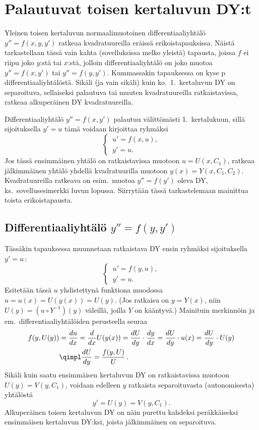 \section{Palautuvat toisen kertaluvun DY:t}
\label{toisen kertaluvun dy}
\alku

Yleinen toisen kertaluvun normaalimuotoinen differentiaaliyhtälö $y''=f(x,y,y')$ ratkeaa
kvadratuureilla eräissä erikoistapauksissa. Näistä tarkastellaan tässä vain kahta
(sovelluksissa melko yleistä) tapausta, joissa $f$ ei riipu joko $y$:stä tai $x$:stä, jolloin 
differentiaaliyhtälö on joko muotoa $y''=f(x,y')$ tai $y''=f(y,y')$. Kummassakin tapauksessa on
kyse   p differentiaaliyhtälöstä. Sikäli 
(ja vain sikäli) kuin ko.\ 1.\ kertaluvun DY on separoituva, sellaiseksi palautuva tai muuten
kvadratuureilla ratkaistavissa, ratkeaa alkuperäinen DY kvadratuureilla.

%
Differentiaaliyhtälö $y''=f(x,y')$ palautuu välittömästi 1.\ kertalukuun, sillä sijoituksella
$y'=u$ tämä voidaan kirjoittaa ryhmäksi
\[
\begin{cases} \,u'=f(x,u), \\ \,y'=u. \end{cases}
\]
Jos tässä ensimmäinen yhtälö on ratkaistavissa muotoon $u=U(x,C_1)$, ratkeaa jälkimmäinen
yhtälö yhdellä kvadratuurilla muotoon $y(x)=Y(x,C_1,C_2)$. Kvadratuureilla ratkeava on esim.\
muotoa $y''=f(y')$ oleva DY, ks.\ sovellusesimerkki luvun lopussa. Siirrytään tässä
tarkastelemaan mainittua toista erikoistapausta.

\subsection*{Differentiaaliyhtälö $y''=f(y,y')$}

Tässäkin tapauksessa muunnetaan ratkaistava DY ensin ryhmäksi sijoituksella $y'=u\,$:
\[ 
\begin{cases} \,u'=f(y,u), \\ \,y'=u. \end{cases}
\]
Esitetään tässä $u$ yhdistettynä funktiona muodossa $u=u(x)=U(y(x))=U(y)$. (Jos ratkaisu on
$y=Y(x)$, niin $U(y)=(u \circ Y^{-1})(y)$ väleillä, joilla $Y$ on kääntyvä.)
Mainituin merkinnöin ja em.\ differentiaaliyhtälöiden perusteella seuraa
\begin{align*}
f(y,U(y)) &= \frac{du}{dx} = \frac{d}{dx}U(y(x)) = \frac{dU}{dy}\cdot\frac{dy}{dx} 
                           = \frac{dU}{dy}\cdot u(x) = \frac{dU}{dy}\cdot U(y) \\
          &\qimpl \frac{dU}{dy} =  \frac{f(y,U)}{U}\,.
\end{align*}
Sikäli kuin saatu ensimmäisen kertaluvun DY on ratkaistavissa muotoon $U(y)=V(y,C_1)$, voidaan
edelleen $y$ ratkaista separoituvasta (autonomisesta) yhtälöstä
\[
y' = U(y) = V(y,C_1).
\]
Alkuperäinen toisen kertaluvun DY on näin purettu kahdeksi peräkkäiseksi ensimmäisen
kertaluvun DY:ksi, joista jälkimmäinen on separoituva.

